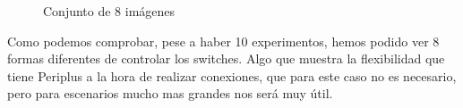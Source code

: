 \documentclass[a4paper, 12pt]{book}
\begin{document}
\begin{figure}[H]
 	
 		\hfill
 		
 		\vspace{10pt} %
 		\hfill
 		
 		\caption{Conjunto de 8 imágenes}
 	\end{figure}
 	
 	Como podemos comprobar, pese a haber 10 experimentos, hemos podido ver 8 formas diferentes de controlar los switches. Algo que muestra la flexibilidad que tiene Periplus a la hora de realizar conexiones, que para este caso no es necesario, pero para escenarios mucho mas grandes nos será muy útil.
 	
\end{document}
